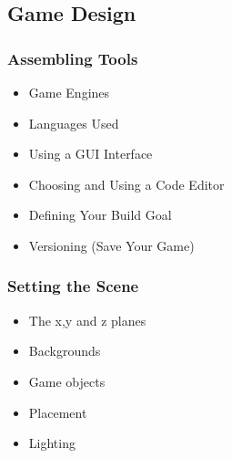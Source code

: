 \documentclass[letterpaper,10pt,english]{sphinxmanual}
\begin{document}
\subsection{Game Design}
\label{gamedev:game-design}

\subsubsection{Assembling Tools}
\label{gamedev:assembling-tools}\begin{itemize}
\item {} 
Game Engines

\item {} 
Languages Used

\item {} 
Using a GUI Interface

\item {} 
Choosing and Using a Code Editor

\item {} 
Defining Your Build Goal

\item {} 
Versioning (Save Your Game)

\end{itemize}


\subsubsection{Setting the Scene}
\label{gamedev:setting-the-scene}\begin{itemize}
\item {} 
The x,y and z planes

\item {} 
Backgrounds

\item {} 
Game objects

\item {} 
Placement

\item {} 
Lighting

\end{itemize}
\end{document}
